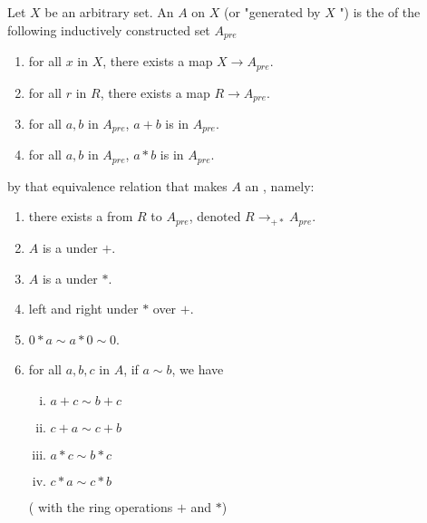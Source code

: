 \begin{definition}
    \label{FreeAlgebra}
    \leanok

    Let $X$ be an arbitrary set.
    An  $A$ on $X$ (or "generated by $X$ ") is the  of the following inductively constructed set $A_{pre}$

    \begin{enumerate}

    \item for all $x$ in $X$, there exists a map $X \to A_{pre}$.
    \item for all $r$ in $R$, there exists a map $R \to A_{pre}$.
    \item for all $a, b$ in $A_{pre}$, $a + b$ is in $A_{pre}$.
    \item for all $a, b$ in $A_{pre}$, $a * b$ is in $A_{pre}$.
    
    \end{enumerate}

    by that equivalence relation that makes $A$ an , namely:

    \begin{enumerate}
    
    \item there exists a  from $R$ to $A_{pre}$, denoted $R \to_{+*} A_{pre}$.
    \item $A$ is a  under $+$.
    \item $A$ is a  under $*$.
    \item left and right  under $*$ over $+$.
    \item $0 * a \sim a * 0 \sim 0$.
    \item for all $a, b, c$ in $A$, if $a \sim b$, we have
    
    \begin{enumerate}[(i)]
    
    \item $a + c \sim b + c$
    \item $c + a \sim c + b$
    \item $a * c \sim b * c$
    \item $c * a \sim c * b$

    \end{enumerate}

    ( with the ring operations $+$ and $*$)

    \end{enumerate}

\end{definition}

